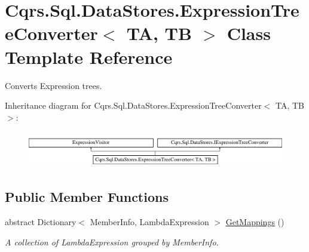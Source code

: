 \hypertarget{classCqrs_1_1Sql_1_1DataStores_1_1ExpressionTreeConverter}{}\section{Cqrs.\+Sql.\+Data\+Stores.\+Expression\+Tree\+Converter$<$ TA, TB $>$ Class Template Reference}
\label{classCqrs_1_1Sql_1_1DataStores_1_1ExpressionTreeConverter}


Converts Expression trees.  


Inheritance diagram for Cqrs.\+Sql.\+Data\+Stores.\+Expression\+Tree\+Converter$<$ TA, TB $>$\+:\begin{figure}[H]
\begin{center}
\leavevmode
\includegraphics[height=1.618497cm]{classCqrs_1_1Sql_1_1DataStores_1_1ExpressionTreeConverter}
\end{center}
\end{figure}
\subsection*{Public Member Functions}
\begin{DoxyCompactItemize}
\item 
abstract Dictionary$<$ Member\+Info, Lambda\+Expression $>$ \hyperlink{classCqrs_1_1Sql_1_1DataStores_1_1ExpressionTreeConverter_abd0d906a5b8abd8520874104d3bfcad0_abd0d906a5b8abd8520874104d3bfcad0}{Get\+Mappings} ()
\begin{DoxyCompactList}\small\item\em A collection of Lambda\+Expression grouped by Member\+Info. \end{DoxyCompactList}\end{DoxyCompactItemize}
